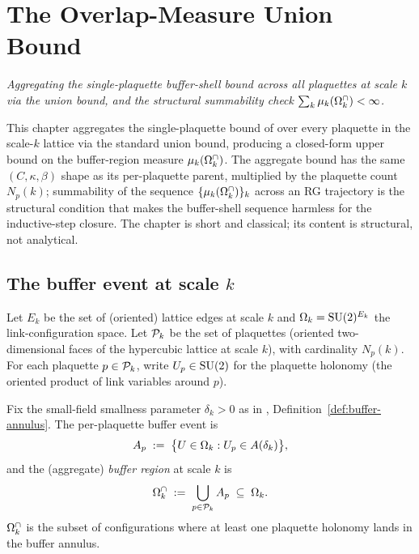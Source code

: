 %

\chapter{The Overlap-Measure Union Bound}
\label{ch:overlap-measure}

\noindent\emph{Aggregating the single-plaquette buffer-shell bound
across all plaquettes at scale $k$ via the union bound, and the
structural summability check $\sum_k \mu_k(\Omega_k^{\cap}) < \infty$.}

This chapter aggregates the single-plaquette bound of
 over every plaquette in the scale-$k$ lattice
via the standard union bound, producing a closed-form upper bound on
the buffer-region measure $\mu_k(\Omega_k^{\cap})$.  The aggregate bound has
the same $(C, \kappa, \beta)$ shape as its per-plaquette parent,
multiplied by the plaquette count $N_p(k)$; summability of the
sequence $\{\mu_k(\Omega_k^{\cap})\}_k$ across an RG trajectory is the
structural condition that makes the buffer-shell sequence harmless
for the inductive-step closure.  The chapter is short and
classical; its content is structural, not analytical.

\section{The buffer event at scale \texorpdfstring{$k$}{k}}
\label{sec:overlap-setup}

Let $E_k$ be the set of (oriented) lattice edges at scale $k$ and
$\Omega_k = \mathrm{SU}(2)^{E_k}$ the link-configuration space.  Let $\mathcal{P}_k$
be the set of plaquettes (oriented two-dimensional faces of the
hypercubic lattice at scale $k$), with cardinality $N_p(k)$.  For
each plaquette $p \in \mathcal{P}_k$, write $U_p \in \mathrm{SU}(2)$ for the
plaquette holonomy (the oriented product of link variables around
$p$).

%

\begin{definition}
\label{def:buffer-region}
Fix the small-field smallness parameter $\delta_k > 0$ as in
, Definition~\ref{def:buffer-annulus}.  The
per-plaquette buffer event is
\begin{equation}
  \label{eq:per-plaquette-event}
  A_p \;:=\; \bigl\{ U \in \Omega_k : U_p \in A(\delta_k) \bigr\},
\end{equation}
and the (aggregate) \emph{buffer region} at scale $k$ is
\begin{equation}
  \label{eq:buffer-region}
  \Omega_k^{\cap} \;:=\; \bigcup_{p \in \mathcal{P}_k} A_p \;\subseteq\; \Omega_k .
\end{equation}
$\Omega_k^{\cap}$ is the subset of configurations where at least one
plaquette holonomy lands in the buffer annulus.
\end{definition}

